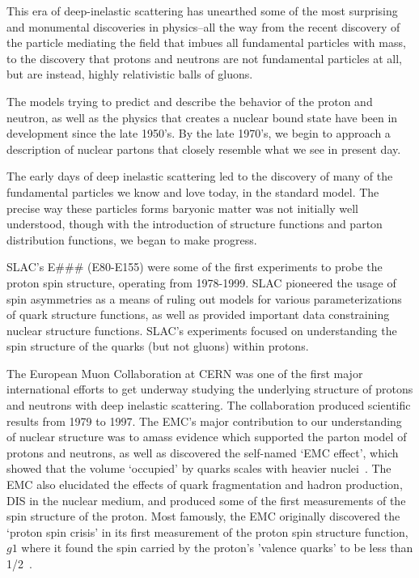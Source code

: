 This era of deep-inelastic scattering has unearthed some of the most surprising
and monumental discoveries in physics--all the way from the recent discovery of
the particle mediating the field that imbues all fundamental particles with
mass, to the discovery that protons and neutrons are not fundamental particles
at all, but are instead, highly relativistic balls of gluons.

The models trying to predict and describe the behavior of the proton and
neutron, as well as the physics that creates a nuclear bound state have been in
development since the late 1950's. By the late 1970's, we begin to approach a
description of nuclear partons that closely resemble what we see in present day.

The early days of deep inelastic scattering led to the discovery of many of the
fundamental particles we know and love today, in the standard model. The
precise way these particles forms baryonic matter was not initially well
understood, though with the introduction of structure functions and parton
distribution functions, we began to make progress.


SLAC's E\#\#\# (E80-E155) were some of the first experiments to probe the proton
spin structure, operating from 1978-1999. SLAC pioneered the usage of spin
asymmetries as a means of ruling out models for various parameterizations of
quark structure functions, as well as provided important data constraining
nuclear structure functions. SLAC's experiments focused on understanding the
spin structure of the quarks (but not gluons) within protons.

The European Muon Collaboration at CERN was one of the first major international
efforts to get underway studying the underlying structure of protons and
neutrons with deep inelastic scattering. The collaboration produced scientific
results from 1979 to 1997. The EMC's major contribution to our understanding of
nuclear structure was to amass evidence which supported the parton model of
protons and neutrons, as well as discovered the self-named `EMC effect', which
showed that the volume `occupied' by quarks scales with heavier
nuclei~\cite{Aubert1983}. The EMC also elucidated the effects of quark
fragmentation and hadron production, DIS in the nuclear medium, and produced
some of the first measurements of the spin structure of the proton. Most
famously, the EMC originally discovered the `proton spin crisis' in its first
measurement of the proton spin structure function, $g1$ where it found the spin
carried by the proton's 'valence quarks' to be less than 1/2~\cite{Ashman1988}. 

